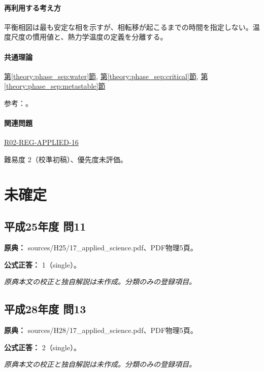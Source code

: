 \paragraph{再利用する考え方} 平衡相図は最も安定な相を示すが、相転移が起こるまでの時間を指定しない。温度尺度の慣用値と、熱力学温度の定義を分離する。

\paragraph{共通理論} \hyperref[theory:phase_sep:water]{第\ref*{theory:phase_sep:water}節}, \hyperref[theory:phase_sep:critical]{第\ref*{theory:phase_sep:critical}節}, \hyperref[theory:phase_sep:metastable]{第\ref*{theory:phase_sep:metastable}節}

\par 参考：\cite{iapws_supercooled2015,iapws95_2018,si_brochure9}。

\paragraph{関連問題} \hyperref[q:r02-reg-applied-16]{R02-REG-APPLIED-16}

\par 難易度 2（校準初稿）、優先度未評価。

\section{未確定}

\subsection{平成25年度 問11}
\label{q:h25-reg-applied-11}

\noindent\textbf{原典：} sources/H25/17\_applied\_science.pdf、PDF物理5頁。

\textbf{公式正答：} 1（single）。

\par\textit{原典本文の校正と独自解説は未作成。分類のみの登録項目。}

\subsection{平成28年度 問13}
\label{q:h28-reg-applied-13}

\noindent\textbf{原典：} sources/H28/17\_applied\_science.pdf、PDF物理5頁。

\textbf{公式正答：} 2（single）。

\par\textit{原典本文の校正と独自解説は未作成。分類のみの登録項目。}
